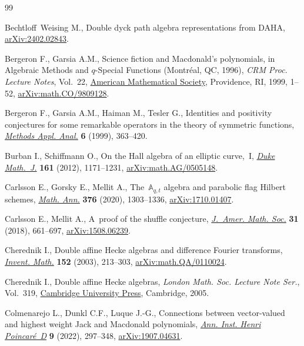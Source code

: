\begin{thebibliography}{99}
\footnotesize\itemsep=0pt

Bechtloff~Weising M., Double dyck path algebra representations from {DAHA},
 \href{http://arxiv.org/abs/2402.02843}{arXiv:2402.02843}.

Bergeron F., Garsia A.M., Science fiction and {M}acdonald's polynomials, in
 Algebraic {M}ethods and {$q$}\nobreakdash-{S}pecial {F}unctions ({M}ontr\'eal, {QC},
 1996), \textit{CRM Proc. Lecture Notes}, Vol.~22,
 \href{https://doi.org/10.1090/crmp/022/01}{American Mathematical Society},
 Providence, RI, 1999, 1--52,
 \href{http://arxiv.org/abs/math.CO/9809128}{arXiv:math.CO/9809128}.

Bergeron F., Garsia A.M., Haiman M., Tesler G., Identities and positivity
 conjectures for some remarkable operators in the theory of symmetric
 functions, \href{https://doi.org/10.4310/MAA.1999.v6.n3.a7}{\textit{Methods
 Appl. Anal.}} \textbf{6} (1999), 363--420.

Burban I., Schiffmann O., On the {H}all algebra of an elliptic curve,~{I},
 \href{https://doi.org/10.1215/00127094-1593263}{\textit{Duke Math.~J.}}
 \textbf{161} (2012), 1171--1231,
 \href{http://arxiv.org/abs/math/0505148}{arXiv:math.AG/0505148}.

Carlsson E., Gorsky E., Mellit A., The~{$\mathbb{A}_{q,t}$} algebra and
 parabolic flag {H}ilbert schemes,
 \href{https://doi.org/10.1007/s00208-019-01898-1}{\textit{Math. Ann.}}
 \textbf{376} (2020), 1303--1336,
 \href{http://arxiv.org/abs/1710.01407}{arXiv:1710.01407}.

Carlsson E., Mellit A., A~proof of the shuffle conjecture,
 \href{https://doi.org/10.1090/jams/893}{\textit{J.~Amer. Math. Soc.}}
 \textbf{31} (2018), 661--697,
 \href{http://arxiv.org/abs/1508.06239}{arXiv:1508.06239}.

Cherednik I., Double affine {H}ecke algebras and difference {F}ourier
 transforms, \href{https://doi.org/10.1007/s00222-002-0240-0}{\textit{Invent.
 Math.}} \textbf{152} (2003), 213--303,
 \href{http://arxiv.org/abs/math.QA/0110024}{arXiv:math.QA/0110024}.

Cherednik I., Double affine {H}ecke algebras, \textit{London Math. Soc. Lecture
 Note Ser.}, Vol.~319,
 \href{https://doi.org/10.1017/CBO9780511546501}{Cambridge University Press},
 Cambridge, 2005.

Colmenarejo L., Dunkl C.F., Luque J.-G., Connections between vector-valued and
 highest weight {J}ack and {M}acdonald polynomials,
 \href{https://doi.org/10.4171/aihpd/119}{\textit{Ann. Inst. Henri
 Poincar\'e~D}} \textbf{9} (2022), 297--348,
 \href{http://arxiv.org/abs/1907.04631}{arXiv:1907.04631}.


\end{thebibliography}
